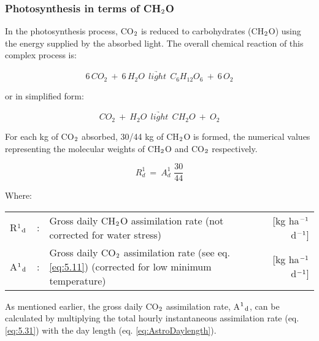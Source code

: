 \subsubsection{Photosynthesis in terms of CH$_{{\rm 2}}$O}
In the photosynthesis process, CO$_{{\rm 2}}$ is reduced to carbohydrates (CH$_{{\rm 2}}$O) using the energy
supplied by the absorbed light. The overall chemical reaction of this complex process is:

\begin{equation}
6\, CO_{2} ~+~ 6\, H_{2}O ~~ \underrightarrow{light} ~~ C_{6} H_{12} O_{6} ~+~ 6\, O_{2}
\end{equation}

or in simplified form:

\begin{equation}
CO_{2} ~+~ H_{2} O~~ \underrightarrow{light} ~~ CH_{2} O ~+~ O_{2}
\end{equation}

For each kg of CO$_{{\rm 2}}$ absorbed, 30/44 kg of CH$_{{\rm 2}}$O is formed, the numerical values
representing the molecular weights of CH$_{{\rm 2}}$O and CO$_{{\rm 2}}$ respectively.

\begin{equation}
R _{d}^{1} ~=~ A _{d}^{1} \,\,{\frac{30}{44}}
\end{equation}

Where:\\[5pt]
\begin{tabularx}{\textwidth}{llXr}
	R$^{{\rm 1}}$$_{{\rm d}}$ &:& Gross daily CH$_{{\rm 2}}$O assimilation rate 
	(not corrected for water stress) &   [kg ha$^{{\rm -1}}$ d$^{{\rm -1}}$]\\
	A$^{{\rm 1}}$$_{{\rm d}}$ &:& Gross daily CO$_{{\rm 2}}$ assimilation rate 
	(see eq. \ref{eq:5.11}) (corrected for low minimum temperature)   &    [kg ha$^{{\rm -1}}$ d$^{{\rm -1}}$]\\   
\end{tabularx}

As mentioned earlier, the gross daily CO$_{{\rm 2}}$ assimilation rate, A$^{{\rm 1}}$$_{{\rm d}}$, 
can be calculated by multiplying the total hourly instantaneous assimilation rate (eq. \ref{eq:5.31}) 
with the day length (eq. \ref{eq:AstroDaylength}). 



